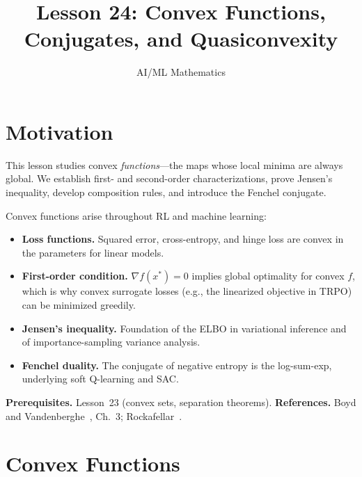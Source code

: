 \documentclass[11pt,a4paper]{article}
\title{Lesson 24: Convex Functions, Conjugates, and Quasiconvexity}
\author{AI/ML Mathematics}
\date{}
\begin{document}
\maketitle
\tableofcontents
\newpage


\section{Motivation}

This lesson studies convex \emph{functions}---the maps whose local minima are
always global.  We establish first- and second-order characterizations, prove
Jensen's inequality, develop composition rules, and introduce the Fenchel
conjugate.

\begin{rlconnection}
Convex functions arise throughout RL and machine learning:
\begin{itemize}
  \item \textbf{Loss functions.}  Squared error, cross-entropy, and hinge
        loss are convex in the parameters for linear models.
  \item \textbf{First-order condition.}  $\nabla f(x^*) = 0$ implies global
        optimality for convex $f$, which is why convex surrogate losses
        (e.g., the linearized objective in TRPO) can be minimized greedily.
  \item \textbf{Jensen's inequality.}  Foundation of the ELBO in variational
        inference and of importance-sampling variance analysis.
  \item \textbf{Fenchel duality.}  The conjugate of negative entropy is the
        log-sum-exp, underlying soft Q-learning and SAC.
\end{itemize}
\end{rlconnection}

\textbf{Prerequisites.}  Lesson~23 (convex sets, separation theorems).
\textbf{References.}  Boyd and Vandenberghe~\cite{boyd2004}, Ch.~3;
Rockafellar~\cite{rockafellar1970}.


\section{Convex Functions}
\end{document}

